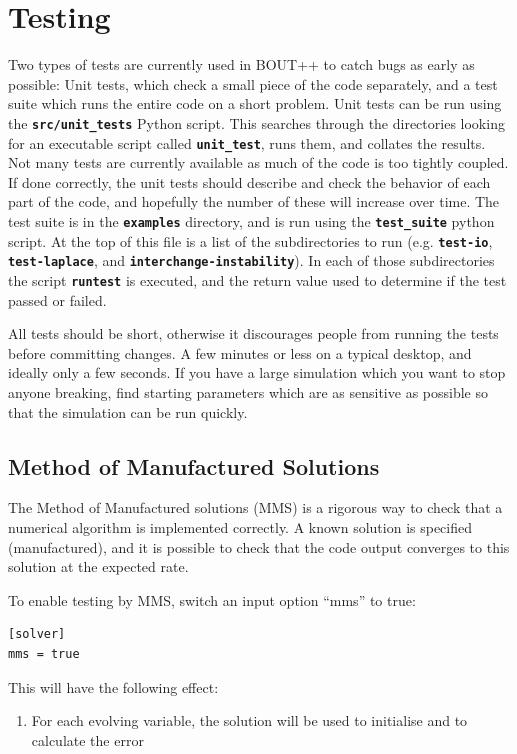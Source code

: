 \documentclass[12pt]{article}
\newcommand{\file}[1]{\texttt{\bf #1}}
\begin{document}
\section{Testing}
%
Two types of tests are currently used in BOUT++ to catch bugs as early as
possible: Unit tests, which check a small piece of the code separately, and a
test suite which runs the entire code on a short problem.
%
%
Unit tests can be run using the \file{src/unit\_tests} Python script. This
searches through the directories looking for an executable script called
\file{unit\_test}, runs them, and collates the results. Not many tests are
currently available as much of the code is too tightly coupled. If done
correctly, the unit tests should describe and check the behavior of each part
of the code, and hopefully the number of these will increase over time.
%
%
The test suite is in the \file{examples} directory, and is run using the
\file{test\_suite} python script. At the top of this file is a list of the
subdirectories to run (e.g. \file{test-io}, \file{test-laplace}, and
\file{interchange-instability}). In each of those subdirectories the script
\file{runtest} is executed, and the return value used to determine if the test
passed or failed.

All tests should be short, otherwise it discourages people from running the
tests before committing changes. A few minutes or less on a typical desktop,
and ideally only a few seconds. If you have a large simulation which you want
to stop anyone breaking, find starting parameters which are as sensitive as
possible so that the simulation can be run quickly.



\subsection{Method of Manufactured Solutions}
%
The Method of Manufactured solutions (MMS) is a rigorous way to check that a
numerical algorithm is implemented correctly. A known solution is specified
(manufactured), and it is possible to check that the code output converges to
this solution at the expected rate.

To enable testing by MMS, switch an input option ``mms'' to true:
%
\begin{lstlisting}
[solver]
mms = true
\end{lstlisting}
%
This will have the following effect:
%
\begin{enumerate}
\item For each evolving variable, the solution will be used to initialise and
    to calculate the error
\end{enumerate}
%
\end{document}
